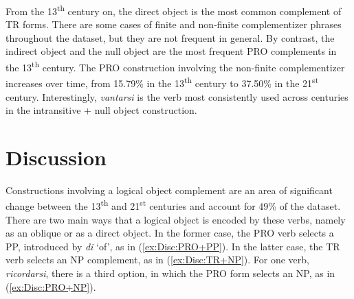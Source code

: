\documentclass[output=paper,colorlinks,citecolor=brown]{langscibook}
\begin{document}
From the 13\textsuperscript{th} century on, the direct object is the most common complement of TR forms. There are some cases of finite and non-finite complementizer phrases throughout the dataset, but they are not frequent in general. By contrast, the indirect object and the null object are the most frequent PRO complements in the 13\textsuperscript{th} century. The PRO construction involving the non-finite complementizer increases over time, from 15.79\% in the 13\textsuperscript{th} century to 37.50\% in the 21\textsuperscript{st} century. Interestingly, \textit{vantarsi} is the verb most consistently used across centuries in the intransitive + null object construction.

\section{Discussion} \label{discussion}

Constructions involving a logical object complement are an area of significant change between the 13\textsuperscript{th} and 21\textsuperscript{st} centuries and account for 49\% of the dataset. There are two main ways that a logical object is encoded by these verbs, namely as an oblique or as a direct object. In the former case, the PRO verb selects a PP, introduced by \textit{di} ‘of’, as in (\ref{ex:Disc:PRO+PP}). In the latter case, the TR verb selects an NP complement, as in (\ref{ex:Disc:TR+NP}). For one verb, \textit{ricordarsi}, there is a third option, in which the PRO form selects an NP, as in (\ref{ex:Disc:PRO+NP}).
\end{document}
